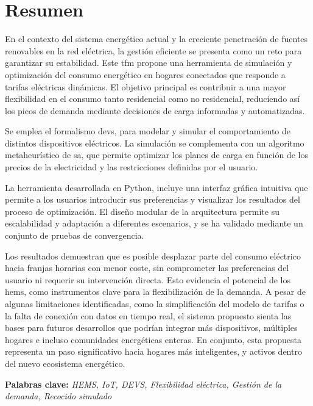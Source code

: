 \documentclass[11pt,a4paper]{book}
\begin{document}
\clearpage

\chapter*{Resumen}
En el contexto del sistema energético actual y la creciente penetración de fuentes renovables en la red eléctrica, la gestión eficiente se presenta como un reto para garantizar su estabilidad. Este \gls{tfm} propone una herramienta de simulación y optimización del consumo energético en hogares conectados que responde a tarifas eléctricas dinámicas. El objetivo principal es contribuir a una mayor flexibilidad en el consumo tanto residencial como no residencial, reduciendo así los picos de demanda mediante decisiones de carga informadas y automatizadas.

Se emplea el formalismo \gls{devs}, para modelar y simular el comportamiento de distintos dispositivos eléctricos. La \mbox{simulación} se complementa con un algoritmo metaheurístico de \gls{sa}, que permite optimizar los planes de carga en función de los precios de la electricidad y las restricciones definidas por el usuario.

La herramienta desarrollada en Python, incluye una interfaz gráfica intuitiva que permite a los usuarios introducir sus preferencias y visualizar los resultados del proceso de optimización. El diseño modular de la arquitectura permite su escalabilidad y adaptación a diferentes escenarios, y se ha validado mediante un conjunto de pruebas de convergencia.

Los resultados demuestran que es posible desplazar parte del consumo eléctrico hacia franjas horarias con menor coste, sin comprometer las preferencias del usuario ni requerir su intervención directa. Esto evidencia el potencial de los \gls{hems}, como instrumentos clave para la flexibilización de la demanda. A pesar de algunas limitaciones identificadas, como la simplificación del modelo de tarifas o la falta de conexión con datos en tiempo real, el sistema propuesto sienta las bases para futuros desarrollos que podrían integrar más dispositivos, múltiples hogares e incluso comunidades energéticas enteras. En conjunto, esta propuesta representa un paso significativo hacia hogares más inteligentes, y activos dentro del nuevo ecosistema energético.

\vspace{1cm}

\noindent\textbf{Palabras clave: }\textit{HEMS, IoT, DEVS, Flexibilidad eléctrica, Gestión de la demanda, Recocido simulado}
\end{document}
